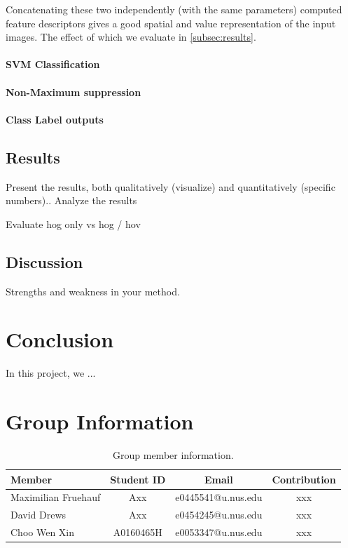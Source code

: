 \documentclass[11pt]{article}
\begin{document}
Concatenating these two independently (with the same parameters) computed feature descriptors gives a good spatial and
value representation of the input images. The effect of which we evaluate in \autoref{subsec:results}.


\paragraph{SVM Classification}


\paragraph{Non-Maximum suppression}


\paragraph{Class Label outputs}




\subsection{Results}\label{subsec:results}
Present the results, both qualitatively (visualize) and quantitatively (specific numbers)..
Analyze the results

Evaluate hog only vs hog / hov
\subsection{Discussion}
Strengths and weakness in your method.

\section{Conclusion}
In this project, we ...

\section{Group Information}
\begin{table}[ht]
    \centering
    \begin{tabular}{lccc}
    \toprule
     Member & Student ID & Email & Contribution\\
    \midrule
    Maximilian Fruehauf& Axx & e0445541@u.nus.edu & xxx \\
    David Drews& Axx &e0454245@u.nus.edu & xxx  \\
    Choo Wen Xin& A0160465H & e0053347@u.nus.edu & xxx  \\
    \bottomrule
    \end{tabular}
    \caption{Group member information.}
    \label{tab:dataset}
\end{table}



 
\end{document}
